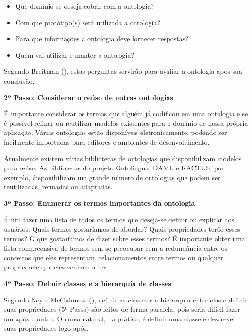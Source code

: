   \begin{itemize}
   \item Que domínio se deseja cobrir com a ontologia?
   \item Com que protótipo(s) será utilizada a ontologia?
   \item Para que informações a ontologia deve fornecer respostas?
   \item Quem vai utilizar e manter a ontologia?
  \end{itemize}
  
  Segundo Breitman (\citeyear{breitman05}), estas perguntas servirão para avaliar a ontologia após sua conclusão.
  
\vspace{0.5cm}  
  
{\raggedright  
  \textbf{2º Passo: Considerar o reúso de outras ontologias}
}
  
  É importante considerar os termos que alguém já codificou em uma ontologia e se é possível refinar ou reutilizar
  modelos existentes para o domínio de nossa própria aplicação. Várias ontologias estão disponíveis eletronicamente,
  podendo ser facilmente importadas para editores e ambientes de desenvolvimento. \cite{breitman05}
  
  Atualmente existem várias bibliotecas de ontologias que disponibilizam modelos para reúso. As bibliotecas do projeto
  Ontolingua, DAML e KACTUS, por exemplo, disponibilizam um grande número de ontologias que podem ser reutilizadas, refinadas
  ou adaptadas. \cite{breitman05}
  
\vspace{0.5cm}  
  
{\raggedright  
  \textbf{3º Passo: Enumerar os termos importantes da ontologia}
}
  
  É útil fazer uma lista de todos os termos que deseja-se definir ou explicar aos usuários. Quais termos gostaríamos de abordar? 
  Quais propriedades terão esses termos? O que gostaríamos de dizer sobre esses termos? É importante obter uma lista compreensiva 
  de termos sem se preocupar com a redundância entre os conceitos que eles representam, relacionamentos entre termos ou qualquer 
  propriedade que eles venham a ter. \cite{noy15}
  
\vspace{0.5cm}  
  
{\raggedright  
  \textbf{4º Passo: Definir classes e a hierarquia de classes}
}
  
  Segundo Noy e McGuinness (\citeyear{noy15}), definir as classes e a hierarquia entre elas e definir  suas propriedades (5º Passo)
  são feitos de forma paralela,  pois seria difícil fazer um após o outro. O curso natural, na prática, é definir uma classe e 
  descrever suas propriedades logo após.
  
